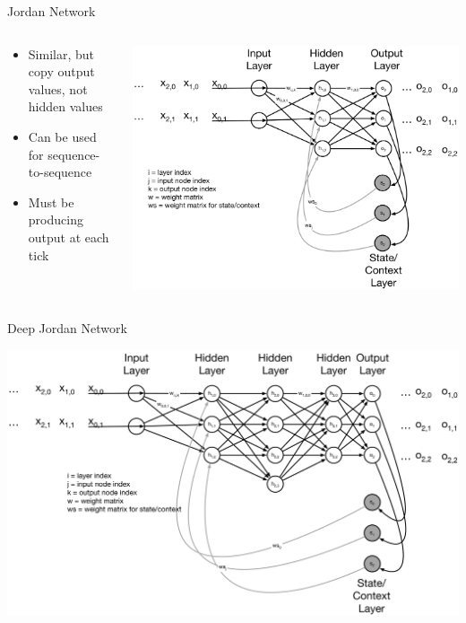 \documentclass[aspectratio=169]{beamer}
\begin{document}
\begin{frame}{Jordan Network}

\begin{columns}
\begin{column}{0.4\textwidth}
\begin{itemize} 
	\item Similar, but copy output values, not hidden values
	\item Can be used for sequence-to-sequence
	\item Must be producing output at each tick
\end{itemize}
\end{column}
\begin{column}{0.6\textwidth}
\includegraphics[width=1\textwidth]{lectRNN/Jordan.pdf}
\end{column}
\end{columns}
\end{frame}
\begin{frame}{Deep Jordan Network}

\includegraphics[width=1\textwidth]{lectRNN/JordanDeep.pdf}

\end{frame}
\end{document}
